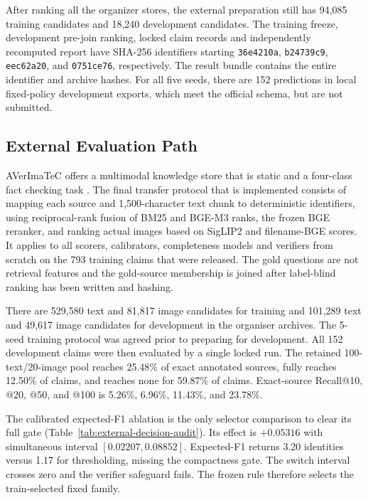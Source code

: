 After ranking all the organizer stores, the external preparation still has 94,085 training candidates and 18,240 development candidates. The training freeze, development pre-join ranking, locked claim records and independently recomputed report have SHA-256 identifiers starting \texttt{36e4210a}, \texttt{b24739c9}, \texttt{eec62a20}, and \texttt{0751ce76}, respectively. The result bundle contains the entire identifier and archive hashes. For all five seeds, there are 152 predictions in local fixed-policy development exports, which meet the official schema, but are not submitted.

\subsection{External Evaluation Path}
\label{sec:external}

AVerImaTeC offers a multimodal knowledge store that is static and a four-class fact checking task \cite{cao2026averimatecshared}. The final transfer protocol that is implemented consists of mapping each source and 1,500-character text chunk to deterministic identifiers, using reciprocal-rank fusion of BM25 and BGE-M3 ranks, the frozen BGE reranker, and ranking actual images based on SigLIP2 and filename-BGE scores. It applies to all scorers, calibrators, completeness models and verifiers from scratch on the 793 training claims that were released. The gold questions are not retrieval features and the gold-source membership is joined after label-blind ranking has been written and hashing.

There are 529,580 text and 81,817 image candidates for training and 101,289 text and 49,617 image candidates for development in the organiser archives. The 5-seed training protocol was agreed prior to preparing for development. All 152 development claims were then evaluated by a single locked run. The retained 100-text/20-image pool reaches 25.48\% of exact annotated sources, fully reaches 12.50\% of claims, and reaches none for 59.87\% of claims. Exact-source Recall@10, @20, @50, and @100 is 5.26\%, 6.96\%, 11.43\%, and 23.78\%.

The calibrated expected-F1 ablation is the only selector comparison to clear its full gate (Table~\ref{tab:external-decision-audit}). Its effect is $+0.05316$ with simultaneous interval $[0.02207,0.08852]$. Expected-F1 returns 3.20 identities versus 1.17 for thresholding, missing the compactness gate. The switch interval crosses zero and the verifier safeguard fails. The frozen rule therefore selects the train-selected fixed family.


